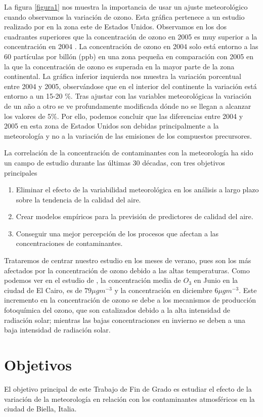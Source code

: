 \documentclass[12pt]{article}
\begin{document}
La figura \ref{figura1}   nos muestra la importancia de usar un ajuste meteorológico cuando observamos la  variación de ozono. Esta gráfica pertenece a un estudio realizado por  \citep{camalier2017}  en la zona este de Estados Unidos. Observamos en los dos cuadrantes superiores que la concentración de ozono en 2005 es muy superior  a la  concentración en 2004 . La concentración de ozono en 2004 solo está entorno a las  60 partículas por billón (ppb) en una zona pequeña en comparación con 2005 en la que la  concentración de ozono es superada en la mayor parte de la zona continental. La gráfica inferior izquierda nos muestra la variación porcentual entre 2004 y 2005,  observándose que en el interior del continente la variación está entorno a un 15-20 \%. Tras ajustar con las variables meteorológicas la variación de un año a otro se ve profundamente modificada dónde no se llegan a alcanzar los  valores de 5\%. Por ello, podemos concluir que las diferencias entre 2004 y 2005 en esta zona de Estados Unidos son debidas principalmente a la meteorología y no a la variación de las emisiones de los compuestos precursores.
 

 La correlación de la concentración de contaminantes con la meteorología  ha sido un campo de estudio durante las últimas 30 décadas, con tres objetivos principales
 \begin{enumerate}
 \item Eliminar el efecto de la variabilidad meteorológica en los análisis a largo plazo sobre la tendencia de la calidad del aire.
 \item Crear modelos empíricos para la previsión de predictores de calidad del aire.
 \item Conseguir una mejor percepción de los procesos que afectan a las concentraciones de contaminantes.
 \end{enumerate}
 
 Trataremos de centrar nuestro estudio en los meses de verano, pues son los más afectados por la concentración de ozono debido a las altas temperaturas. Como podemos ver en el estudio de \citet{hamdy}, la concentración media de $O_3$ en Junio en la ciudad de El Cairo, es de $79\mu gm^{-3}$ y  la concentración en diciembre $6\mu gm^{-3}$. Este incremento en la concentración de ozono se debe a los mecanismos de producción fotoquímica del ozono, que son catalizados debido a la  alta intensidad de radiación solar; mientras  las bajas concentraciones en invierno se deben a una baja intensidad de radiación solar. 

\section{Objetivos} \label{sec:objetivos}
El objetivo principal de este Trabajo de Fin de Grado  es estudiar el efecto de la variación de la meteorología en relación con los contaminantes atmosféricos en la ciudad de Biella, Italia. 
\end{document}
